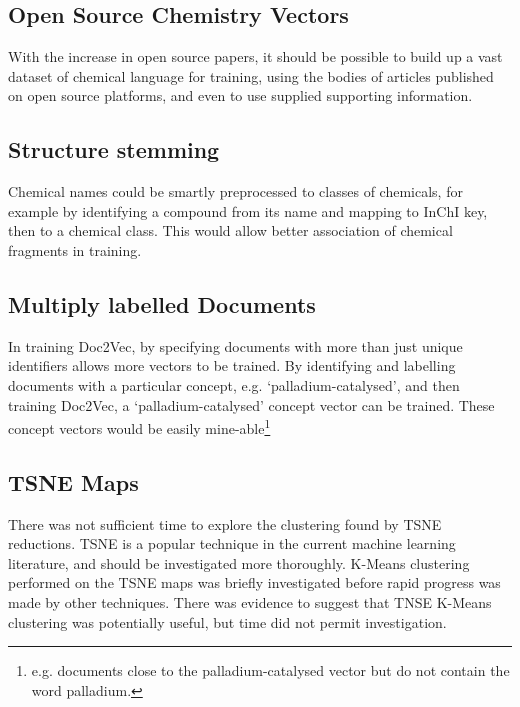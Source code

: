 \subsection{Open Source Chemistry Vectors}
With the increase in open source papers, it should be possible to build up a vast dataset of chemical language for training, using the bodies of articles published on open source platforms, and even to use supplied supporting information. 
\subsection{Structure stemming}
Chemical names could be smartly preprocessed to classes of chemicals, for example by identifying a compound from its name and mapping to InChI key, then to a chemical class. This would allow better association of chemical fragments in training.
\subsection{Multiply labelled Documents}
In training Doc2Vec, by specifying documents with more than just unique identifiers allows more vectors to be trained. By identifying and labelling documents with a particular concept, e.g. `palladium-catalysed', and then training Doc2Vec, a `palladium-catalysed' concept vector can be trained. These concept vectors would be easily mine-able\footnote{e.g. documents close to the palladium-catalysed vector but do not contain the word palladium.}
\subsection{TSNE Maps}
There was not sufficient time to explore the clustering found by TSNE reductions. TSNE is a popular technique in the current machine learning literature, and should be investigated more thoroughly. K-Means clustering performed on the TSNE maps was briefly investigated before rapid progress was made by other techniques. There was evidence to suggest that TNSE K-Means clustering was potentially useful, but time did not permit investigation.